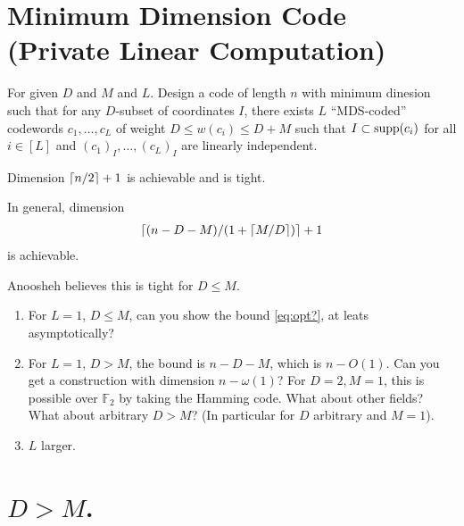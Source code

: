 \section{Minimum Dimension Code (Private Linear Computation)}

\begin{question}
  For given $D$ and $M$ and $L$.
  Design a code of length $n$ with minimum dinesion such that for any $D$-subset of coordinates $I$, there exists $L$ ``MDS-coded'' codewords $c_1,\dots,c_L$ of weight $D\le w(c_i)\le D+M$  such that $I\subset \operatorname*{supp}(c_i)$ for all $i\in[L]$ and $(c_1)_I,\dots,(c_L)_I$ are linearly independent.
\end{question}

\begin{theorem}
  Dimension $\lceil {n/2}\rceil+1$  is achievable and is tight.

  In general, dimension 
  \begin{align}
  \lceil {(n-D-M)/(1+\lceil {M/D}\rceil)}\rceil+1 
  \label{eq:opt?}
  \end{align}
  is achievable. 
  
  Anoosheh believes this is tight for $D\le M$.
  \label{}
\end{theorem}

\begin{enumerate}
  \item For $L=1$, $D\le M$, can you show the bound \eqref{eq:opt?}, at leats asymptotically?

  \item For $L=1$, $D>M$, the bound is $n-D-M$, which is $n-O(1)$. Can you get a construction with dimension $n-\omega(1)$? For $D=2,M=1$, this is possible over $\mathbb{F}_2$ by taking the Hamming code.
    What about other fields? What about arbitrary $D>M$? (In particular for $D$ arbitrary and $M=1$).

  \item $L$ larger.
\end{enumerate}


\section{$D>M$.}

